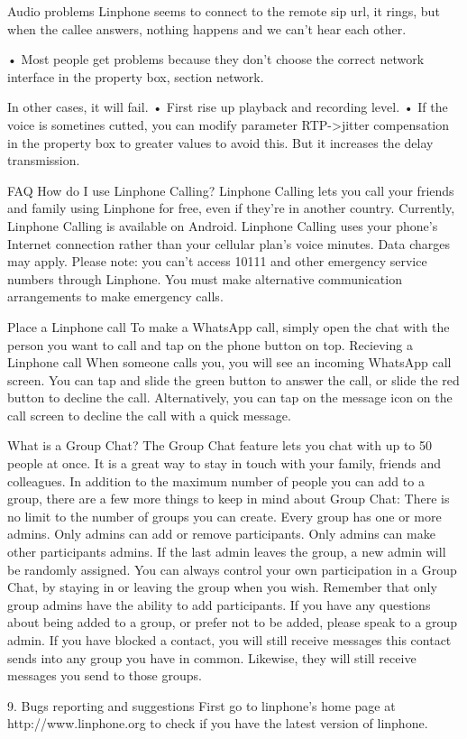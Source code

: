 \documentclass[a4paper]{article}
\begin{document}
Audio problems
Linphone seems to connect to the remote sip url, it rings, but when the callee answers,
nothing happens and we can’t hear each other.

• Most people get problems because they don’t choose the correct network interface
in the property box, section network. 

In other cases, it will fail.
• First rise up playback and recording level.
• If the voice is sometines cutted, you can modify parameter RTP->jitter
compensation in the property box to greater values to avoid this. But it increases the
delay transmission.

FAQ
How do I use Linphone Calling?
Linphone Calling lets you call your friends and family using Linphone for free, even if they’re in another country. Currently, Linphone Calling is available on Android.
Linphone Calling uses your phone’s Internet connection rather than your cellular plan’s voice minutes. Data charges may apply.
Please note: you can’t access 10111 and other emergency service numbers through Linphone. You must make alternative communication arrangements to make emergency calls.

Place a Linphone call
To make a WhatsApp call, simply open the chat with the person you want to call and tap on the phone button on top.
Recieving a Linphone call
When someone calls you, you will see an incoming WhatsApp call screen. You can tap and slide the green button to answer the call, or slide the red button to decline the call. Alternatively, you can tap on the message icon on the call screen to decline the call with a quick message.

What is a Group Chat?
The Group Chat feature lets you chat with up to 50 people at once. It is a great way to stay in touch with your family, friends and colleagues. In addition to the maximum number of people you can add to a group, there are a few more things to keep in mind about Group Chat:
There is no limit to the number of groups you can create.
Every group has one or more admins. Only admins can add or remove participants.
Only admins can make other participants admins.
If the last admin leaves the group, a new admin will be randomly assigned.
You can always control your own participation in a Group Chat, by staying in or leaving the group when you wish. Remember that only group admins have the ability to add participants. If you have any questions about being added to a group, or prefer not to be added, please speak to a group admin.
If you have blocked a contact, you will still receive messages this contact sends into any group you have in common. Likewise, they will still receive messages you send to those groups.



9. Bugs reporting and suggestions
First go to linphone’s home page at http://www.linphone.org to check if you have the
latest version of linphone.
\end{document}
